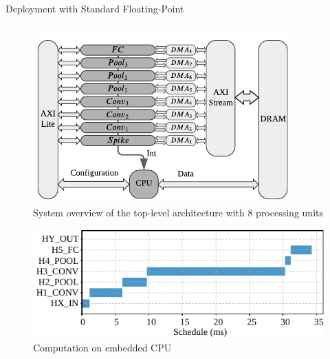 \begin{frame}{Deployment with Standard Floating-Point}
	\begin{columns}
		\begin{column}{0.5\textwidth}
			\begin{minipage}[c][.45\textheight][c]{\linewidth}
				\centering
				\begin{figure}
				\includegraphics[width=0.75\linewidth]{./slides/figures/sbs_hw_experimental.pdf} %
				\caption{System overview of the top-level architecture with 8 processing units}
				\end{figure}
				\pause
			\end{minipage}
			
			\begin{minipage}[c][.45\textheight][c]{\linewidth}
				\centering
				\begin{figure}
				\includegraphics[width=0.75\linewidth]{../chapters/sbs_accelerator/figures/latency_sw.pdf} %
				\caption{Computation on embedded CPU}
				\end{figure}
				\pause
			\end{minipage}
		\end{column}
		

\end{columns}
\end{frame}
